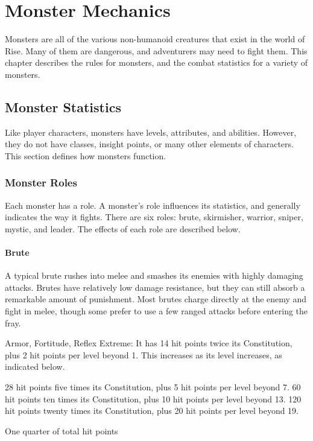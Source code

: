 \chapter{Monster Mechanics}

Monsters are all of the various non-humanoid creatures that exist in the world of Rise.
Many of them are dangerous, and adventurers may need to fight them.
This chapter describes the rules for monsters, and the combat statistics for a variety of monsters.

\section{Monster Statistics}
  Like player characters, monsters have levels, attributes, and abilities.
  However, they do not have classes, insight points, or many other elements of characters.
  This section defines how monsters function.

  \subsection{Monster Roles}
    Each monster has a role.
    A monster's role influences its statistics, and generally indicates the way it fights.
    There are six roles: brute, skirmisher, warrior, sniper, mystic, and leader.
    The effects of each role are described below.

    \subsubsection{Brute}
      A typical brute rushes into melee and smashes its enemies with highly damaging attacks.
      Brutes have relatively low damage resistance, but they can still absorb a remarkable amount of punishment.
      Most brutes charge directly at the enemy and fight in melee, though some prefer to use a few ranged attacks before entering the fray.

        Armor,  Fortitude,  Reflex
       Extreme: It has 14 hit points \add twice its Constitution, plus 2 hit points per level beyond 1.
      This increases as its level increases, as indicated below.
      \begin{itemize}
         28 hit points \add five times its Constitution, plus 5 hit points per level beyond 7.
         60 hit points \add ten times its Constitution, plus 10 hit points per level beyond 13.
         120 hit points \add twenty times its Constitution, plus 20 hit points per level beyond 19.
      \end{itemize}
       One quarter of total hit points

